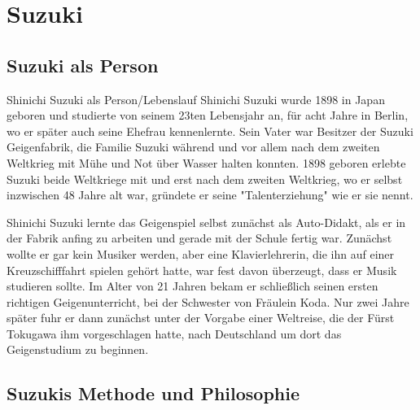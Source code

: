 \section{Suzuki}

\subsection{Suzuki als Person} Shinichi Suzuki als Person/Lebenslauf
Shinichi Suzuki wurde 1898 in Japan geboren und studierte
von seinem 23ten Lebensjahr an, für acht Jahre
in Berlin, wo er später auch seine Ehefrau kennenlernte. Sein
Vater war Besitzer der Suzuki Geigenfabrik, die Familie Suzuki während und vor allem nach dem zweiten
Weltkrieg mit Mühe und Not über Wasser halten konnten. 1898 geboren erlebte Suzuki beide Weltkriege mit und erst nach
dem zweiten Weltkrieg, wo er selbst inzwischen 48 Jahre alt war, gründete er seine
"Talenterziehung" wie er sie nennt. 

Shinichi Suzuki lernte das Geigenspiel selbst zunächst als Auto-Didakt, als er in der Fabrik
anfing zu arbeiten und gerade mit der Schule fertig war. Zunächst wollte er gar
kein Musiker werden, aber eine Klavierlehrerin, die ihn auf einer
Kreuzschifffahrt spielen gehört hatte, war fest davon überzeugt, dass er Musik studieren
sollte. \autocite[89]{suzuki:erziehung_ist_liebe}
Im Alter von 21 Jahren bekam er schließlich seinen ersten richtigen Geigenunterricht, bei der Schwester
von Fräulein Koda. Nur zwei Jahre später fuhr er dann zunächst unter der Vorgabe einer Weltreise, die der
Fürst Tokugawa ihm vorgeschlagen hatte, nach Deutschland um dort das Geigenstudium zu
beginnen. \autocite[90ff]{suzuki:erziehung_ist_liebe}

\subsection{Suzukis Methode und Philosophie}

